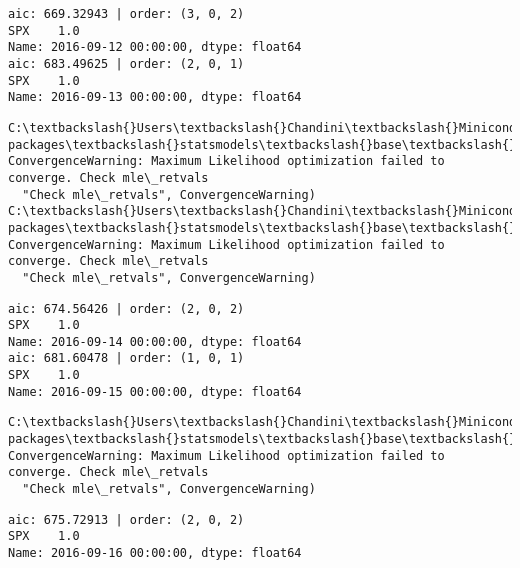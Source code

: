 \documentclass[11pt]{article}
\begin{document}
    \begin{Verbatim}[commandchars=\\\{\}]
aic: 669.32943 | order: (3, 0, 2)
SPX    1.0
Name: 2016-09-12 00:00:00, dtype: float64
aic: 683.49625 | order: (2, 0, 1)
SPX    1.0
Name: 2016-09-13 00:00:00, dtype: float64

    \end{Verbatim}

    \begin{Verbatim}[commandchars=\\\{\}]
C:\textbackslash{}Users\textbackslash{}Chandini\textbackslash{}Miniconda3\textbackslash{}envs\textbackslash{}auquan\textbackslash{}lib\textbackslash{}site-packages\textbackslash{}statsmodels\textbackslash{}base\textbackslash{}model.py:496: ConvergenceWarning: Maximum Likelihood optimization failed to converge. Check mle\_retvals
  "Check mle\_retvals", ConvergenceWarning)
C:\textbackslash{}Users\textbackslash{}Chandini\textbackslash{}Miniconda3\textbackslash{}envs\textbackslash{}auquan\textbackslash{}lib\textbackslash{}site-packages\textbackslash{}statsmodels\textbackslash{}base\textbackslash{}model.py:496: ConvergenceWarning: Maximum Likelihood optimization failed to converge. Check mle\_retvals
  "Check mle\_retvals", ConvergenceWarning)

    \end{Verbatim}

    \begin{Verbatim}[commandchars=\\\{\}]
aic: 674.56426 | order: (2, 0, 2)
SPX    1.0
Name: 2016-09-14 00:00:00, dtype: float64
aic: 681.60478 | order: (1, 0, 1)
SPX    1.0
Name: 2016-09-15 00:00:00, dtype: float64

    \end{Verbatim}

    \begin{Verbatim}[commandchars=\\\{\}]
C:\textbackslash{}Users\textbackslash{}Chandini\textbackslash{}Miniconda3\textbackslash{}envs\textbackslash{}auquan\textbackslash{}lib\textbackslash{}site-packages\textbackslash{}statsmodels\textbackslash{}base\textbackslash{}model.py:496: ConvergenceWarning: Maximum Likelihood optimization failed to converge. Check mle\_retvals
  "Check mle\_retvals", ConvergenceWarning)

    \end{Verbatim}

    \begin{Verbatim}[commandchars=\\\{\}]
aic: 675.72913 | order: (2, 0, 2)
SPX    1.0
Name: 2016-09-16 00:00:00, dtype: float64

    \end{Verbatim}
\end{document}
